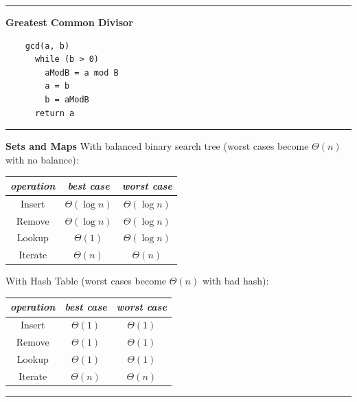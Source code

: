 \documentclass[9pt]{amsart}
\begin{document}
\begin{multicols*}{3}
  \vskip 7pt
  \hrule
  \vskip 7pt

  \textbf{Greatest Common Divisor}
  \begin{lstlisting}
    gcd(a, b)
      while (b > 0)
        aModB = a mod B
        a = b
        b = aModB
      return a
  \end{lstlisting}

  \vskip 7pt
  \hrule
  \vskip 7pt

  \textbf{Sets and Maps}
  \newline
  With balanced binary search tree (worst cases become $\Theta(n)$ with no balance):
  \footnotesize
  \begin{center}
  \begin{tabular}{c | c | c}
     \emph{operation} & \emph{best case} & \emph{worst case} \\
     \hline
     Insert & $\Theta(\log n)$ & $\Theta(\log n)$ \\
     \hline
     Remove & $\Theta(\log n)$ & $\Theta(\log n)$ \\
     \hline
     Lookup & $\Theta(1)$ & $\Theta(\log n)$ \\
     \hline
     Iterate & $\Theta(n)$ & $\Theta(n)$ \\
  \end{tabular}
  \end{center}
  \normalsize

  With Hash Table (worst cases become $\Theta(n)$ with bad hash):
  \footnotesize
  \begin{center}
  \begin{tabular}{c | c | c}
     \emph{operation} & \emph{best case} & \emph{worst case} \\
     \hline
     Insert & $\Theta(1)$ & $\Theta(1)$ \\
     \hline
     Remove & $\Theta(1)$ & $\Theta(1)$ \\
     \hline
     Lookup & $\Theta(1)$ & $\Theta(1)$ \\
     \hline
     Iterate & $\Theta(n)$ & $\Theta(n)$ \\
  \end{tabular}
  \end{center}
  \normalsize

  \vskip 7pt
  \hrule
  \vskip 7pt


\end{multicols*}
\end{document}
